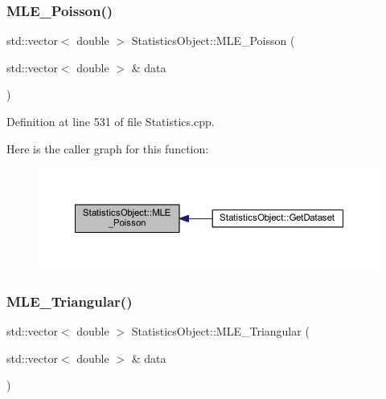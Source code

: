 \subsubsection{\texorpdfstring{M\+L\+E\+\_\+\+Poisson()}{MLE\_Poisson()}}
{\footnotesize\ttfamily std\+::vector$<$ double $>$ Statistics\+Object\+::\+M\+L\+E\+\_\+\+Poisson (\begin{DoxyParamCaption}\item[{std\+::vector$<$ double $>$ \&}]{data }\end{DoxyParamCaption})\hspace{0.3cm}{\ttfamily [protected]}}



Definition at line 531 of file Statistics.\+cpp.

Here is the caller graph for this function\+:
\nopagebreak
\begin{figure}[H]
\begin{center}
\leavevmode
\includegraphics[width=350pt]{class_statistics_object_af0888138520ad6df0c1c84cd3862c6c2_icgraph}
\end{center}
\end{figure}
\mbox{\label{class_statistics_object_aecf3e116092cfcfd2a44e1a1936f7b9d}} 
\subsubsection{\texorpdfstring{M\+L\+E\+\_\+\+Triangular()}{MLE\_Triangular()}}
{\footnotesize\ttfamily std\+::vector$<$ double $>$ Statistics\+Object\+::\+M\+L\+E\+\_\+\+Triangular (\begin{DoxyParamCaption}\item[{std\+::vector$<$ double $>$ \&}]{data }\end{DoxyParamCaption})\hspace{0.3cm}{\ttfamily [protected]}}



